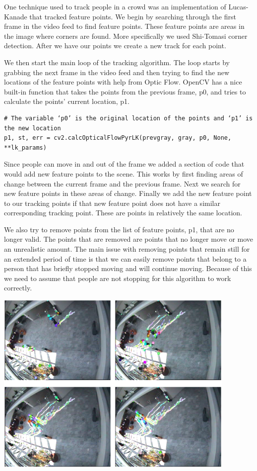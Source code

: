 \documentclass[12pt, onecolumn, conference]{IEEEtran}
\begin{document}
One technique used to track people in a crowd was an implementation of Lucas-Kanade that tracked feature points. We begin by searching through the first frame in the video feed to find feature points. These feature points are areas in the image where corners are found. More specifically we used Shi-Tomasi corner detection. After we have our points we create a new track for each point.

We then start the main loop of the tracking algorithm. The loop starts by grabbing the next frame in the video feed and then trying to find the new locations of the feature points with help from Optic Flow. OpenCV has a nice built-in function that takes the points from the previous frame, p0, and tries to calculate the points' current location, p1.

\begin{lstlisting}
# The variable ‘p0’ is the original location of the points and ‘p1’ is the new location
p1, st, err = cv2.calcOpticalFlowPyrLK(prevgray, gray, p0, None, **lk_params)
\end{lstlisting}

Since people can move in and out of the frame we added a section of code that would add new feature points to the scene. This works by first finding areas of change between the current frame and the previous frame. Next we search for new feature points in these areas of change. Finally we add the new feature point to our tracking points if that new feature point does not have a similar corresponding tracking point. These are points in relatively the same location.

We also try to remove points from the list of feature points, p1, that are no longer valid. The points that are removed are points that no longer move or move an unrealistic amount. The main issue with removing points that remain still for an extended period of time is that we can easily remove points that belong to a person that has briefly stopped moving and will continue moving. Because of this we need to assume that people are not stopping for this algorithm to work correctly.

\begin{center}
\includegraphics[height=3.5in]{Screenshots/Capture12.PNG}
\end{center}
\end{document}
